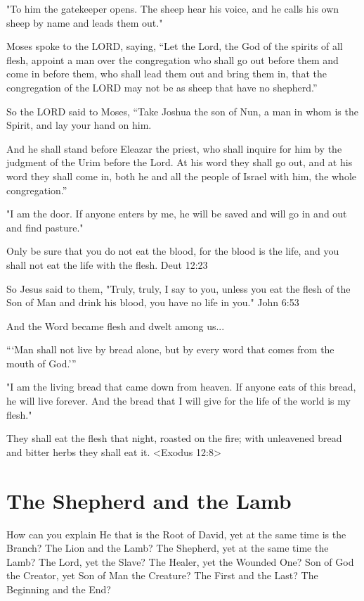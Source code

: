 \documentclass[10pt,oneside,footinclude=true,headinclude=true]{scrbook} %
\begin{document}
"To him the gatekeeper opens. The sheep hear his voice, and he calls his own sheep by name and leads them out."

Moses spoke to the LORD, saying, “Let the Lord, the God of the spirits of all flesh, appoint a man over the congregation who shall go out before them and come in before them, who shall lead them out and bring them in, that the congregation of the LORD may not be as sheep that have no shepherd.”

So the LORD said to Moses, “Take Joshua the son of Nun, a man in whom is the Spirit, and lay your hand on him.

And he shall stand before Eleazar the priest, who shall inquire for him by the judgment of the Urim before the Lord. At his word they shall go out, and at his word they shall come in, both he and all the people of Israel with him, the whole congregation.”

"I am the door. If anyone enters by me, he will be saved and will go in and out and find pasture."

Only be sure that you do not eat the blood, for the blood is the life, and you shall not eat the life with the flesh. Deut 12:23

So Jesus said to them, "Truly, truly, I say to you, unless you eat the flesh of the Son of Man and drink his blood, you have no life in you." John 6:53

And the Word became flesh and dwelt among us...

“‘Man shall not live by bread alone,
    but by every word that comes from the mouth of God.’”

"I am the living bread that came down from heaven. If anyone eats of this bread, he will live forever. And the bread that I will give for the life of the world is my flesh."

They shall eat the flesh that night, roasted on the fire; with unleavened bread and bitter herbs they shall eat it.
<Exodus 12:8>


\chapter{The Shepherd and the Lamb}
How can you explain He that is the Root of David, yet at the same time is the Branch?
The Lion and the Lamb?
The Shepherd, yet at the same time the Lamb?
The Lord, yet the Slave?
The Healer, yet the Wounded One?
Son of God the Creator, yet Son of Man the Creature?
The First and the Last? The Beginning and the End?
\end{document}
